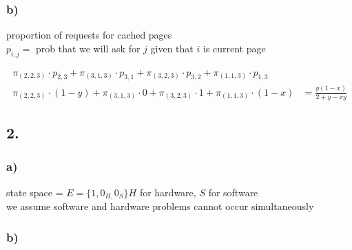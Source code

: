 \subsubsection*{ b) }

proportion of requests for cached pages\\
$p_{{i,j}}=$ prob that we will ask for $j$ given that $i$ is current page

\begin{align*}
\pi _{{\left(2,2,3\right)}}\cdot p_{{2,3}}+\pi _{{\left(3,1,3\right)}}\cdot p_{{3,1}}+\pi _{{\left(3,2,3\right)}}\cdot p_{{3,2}}+\pi _{{\left(1,1,3\right)}}\cdot p_{{1,3}}\\
\pi _{{\left(2,2,3\right)}}\cdot \left(1-y\right)+\pi _{{\left(3,1,3\right)}}\cdot 0+\pi _{{\left(3,2,3\right)}}\cdot 1+\pi _{{\left(1,1,3\right)}}\cdot \left(1-x\right) &= \frac{y\left(1-x\right)}{2+y-xy}
\end{align*}

\subsection*{ 2. }

\subsubsection*{ a) }

state space =  $E=\{1,0_{H,}0_{S}\}H$ for hardware, $S$ for software\\
we assume software and hardware problems cannot occur simultaneously


\subsubsection*{ b) }

